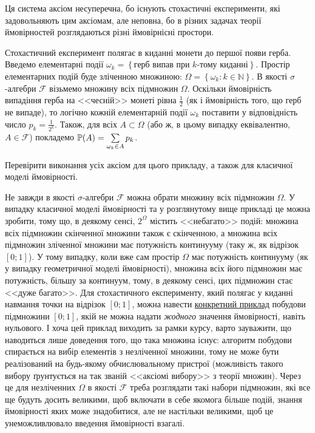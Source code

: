 Ця система аксіом несуперечна, бо існують стохастичні експерименти,
які задовольняють цим аксіомам, але неповна, бо в різних задачах
теорії ймовірностей розглядаються різні ймовірнісні простори.

\begin{example}
    Стохастичний експеримент полягає в киданні монети до першої появи герба. Введемо елементарні події $\omega_k = \left\{ 
        \text{герб випав при } k \text{-тому киданні}
    \right\}$. Простір елементарних подій буде зліченною множиною:
    $\Omega = \left\{\omega_k : k \in \mathbb{N} \right\}$. В якості $\sigma$-алгебри $\mathcal{F}$ візьмемо множину всіх підмножин $\Omega$.
    Оскільки ймовірність випадіння герба на <<чесній>> монеті рівна $\frac{1}{2}$ (як і ймовірність того, що герб не випаде), то логічно кожній елементарній події $\omega_k$ поставити 
    у відповідність число $p_k = \frac{1}{2^k}$. Також, для всіх $A \subset \Omega$ (або ж, в цьому випадку еквівалентно, $A \in \mathcal{F}$) покладемо
    $\P(A) = \sum\limits_{\omega_k \in A} p_k$.
\end{example}

\begin{exercise}
    Перевірити виконання усіх аксіом для цього прикладу, а також для класичної моделі ймовірності.
\end{exercise}

\begin{remark}
    Не завжди в якості $\sigma$-алгебри $\mathcal{F}$ можна обрати множину всіх підмножин $\Omega$. 
    У випадку класичної моделі ймовірності та у розглянутому вище прикладі
    це можна зробити, тому що, в деякому сенсі, $2^{\Omega}$ містить <<небагато>> подій: множина всіх підмножин скінченної множини також
    є скінченною, а множина всіх підмножин зліченної множини має потужність континууму (таку ж, як відрізок $[0; 1]$).
    У тому випадку, коли вже сам простір $\Omega$ має потужність континууму (як у випадку геометричної моделі ймовірності),
    множина всіх його підмножин має потужність, більшу за континуум, тому, в деякому сенсі, цих підмножин стає <<дуже багато>>.
    Для стохастичного експерименту, який полягає у киданні навмання точки на відрізок $[0; 1]$,
    можна навести \href{https://uk.wikipedia.org/wiki/%D0%9C%D0%BD%D0%BE%D0%B6%D0%B8%D0%BD%D0%B0_%D0%92%D1%96%D1%82%D0%B0%D0%BB%D1%96}{конкретний приклад}
    побудови підмножини $[0; 1]$, якій не можна надати \emph{жодного} значення ймовірності, навіть нульового.
    І хоча цей приклад виходить за рамки курсу, варто зауважити, що наводиться лише доведення того, що така множина існує:
    алгоритм побудови спирається на вибір елементів з незліченної множини, тому не може бути реалізований на будь-якому обчислювальному пристрої
    (можливість такого вибору ґрунтується на так званій <<аксіомі вибору>> з теорії множин).
    Через це для незліченних $\Omega$ в якості $\mathcal{F}$ треба розглядати такі набори підмножин, які все ще будуть досить великими,
    щоб включати в себе якомога більше подій, знання ймовірності яких може знадобитися, але не настільки великими, щоб це унеможливлювало введення ймовірності взагалі.
\end{remark}

